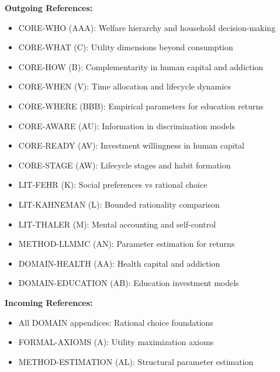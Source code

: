 \begin{tcolorbox}[colback=blue!5!white,colframe=blue!75!black,title=Cross-Reference Map]
\textbf{Outgoing References:}
\begin{itemize}
    \item CORE-WHO (AAA): Welfare hierarchy and household decision-making
    \item CORE-WHAT (C): Utility dimensions beyond consumption
    \item CORE-HOW (B): Complementarity in human capital and addiction
    \item CORE-WHEN (V): Time allocation and lifecycle dynamics
    \item CORE-WHERE (BBB): Empirical parameters for education returns
    \item CORE-AWARE (AU): Information in discrimination models
    \item CORE-READY (AV): Investment willingness in human capital
    \item CORE-STAGE (AW): Lifecycle stages and habit formation
    \item LIT-FEHR (K): Social preferences vs rational choice
    \item LIT-KAHNEMAN (L): Bounded rationality comparison
    \item LIT-THALER (M): Mental accounting and self-control
    \item METHOD-LLMMC (AN): Parameter estimation for returns
    \item DOMAIN-HEALTH (AA): Health capital and addiction
    \item DOMAIN-EDUCATION (AB): Education investment models
\end{itemize}

\textbf{Incoming References:}
\begin{itemize}
    \item All DOMAIN appendices: Rational choice foundations
    \item FORMAL-AXIOMS (A): Utility maximization axioms
    \item METHOD-ESTIMATION (AL): Structural parameter estimation
\end{itemize}
\end{tcolorbox}

